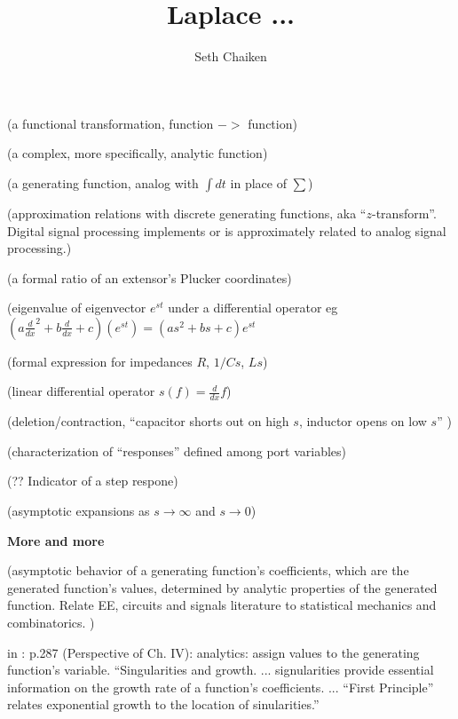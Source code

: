\documentclass{article}
\title{Laplace ... }
\author{Seth Chaiken}
\begin{document}
\maketitle

(a functional transformation, function $->$ function)

(a complex, more specifically, analytic function)

(a generating function, analog with $\int dt$ in place of $\sum$)

(approximation relations with discrete generating functions, 
aka ``$z$-transform''. Digital signal processing implements or
is approximately related to analog signal processing.)

(a formal ratio of an extensor's Plucker coordinates)

(eigenvalue of eigenvector $e^{s t}$ under a differential operator eg 
$(a\frac{d}{dx}^2 + b\frac{d}{dx} + c)(e^{st}) = (as^2 +bs + c)e^{st}$

(formal expression for impedances $R$, $1/Cs$, $Ls$)

(linear differential operator $s(f) = \frac{d}{dx}f$)

(deletion/contraction, 
``capacitor shorts out on high $s$, inductor opens on low $s$'' 
\cite{intuitAna})

(characterization of ``responses'' defined among port variables)

(?? Indicator of a step respone)

(asymptotic expansions as $s\rightarrow\infty$
and $s\rightarrow 0$)

\noindent\textbf{More and more}

(asymptotic behavior of a generating function's coefficients, which are
the generated function's values, determined by analytic properties of the
generated function.  Relate EE, circuits and signals literature to 
statistical mechanics and combinatorics.  
\cite{statMechForGraphers,multivarHalfPlane,AnalyticCombinatoricsBook})

in \cite{AnalyticCombinatoricsBook}: p.287 (Perspective of Ch. IV):
analytics: assign values to the generating function's variable.
``Singularities and growth. ... signularities provide essential information 
on the growth rate of a function's coefficients.  ... ``First Principle''
relates 
exponential growth to the location of sinularities.''
\end{document}
